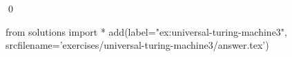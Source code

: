 
\begin{ex} 
  \label{ex:universal-turing-machine3}
  
  \qed
\end{ex} 
\begin{python0}
from solutions import *
add(label="ex:universal-turing-machine3",
    srcfilename='exercises/universal-turing-machine3/answer.tex') 
\end{python0}

